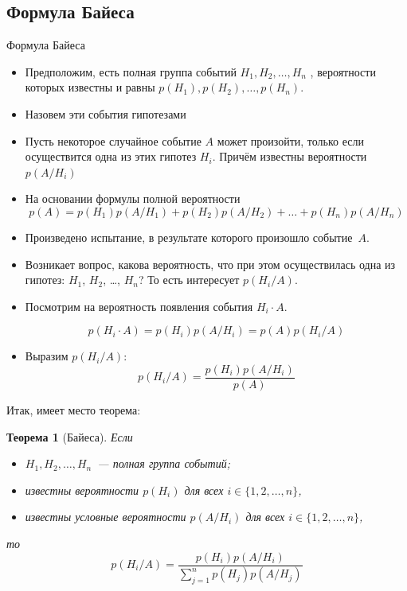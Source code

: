 \documentclass[unicode,11pt,notheorems,xcolor=table]{beamer}
\newtheorem{theorem}{Теорема}
\begin{document}
\subsection{Формула Байеса}
\begin{frame}[allowframebreaks]{Формула Байеса}
    \begin{itemize}
        \item Предположим, есть полная группа событий $H_1,H_2, \ldots, H_n$ , вероятности которых известны и равны $p(H_1), p(H_2),\ldots, p(H_n)$.
        \item Назовем эти события \alert{гипотезами}
        \item Пусть некоторое случайное событие $A$ может произойти, только если осуществится одна из этих гипотез $H_i$. Причём известны вероятности $p(A/H_i)$
        \item На основании формулы полной вероятности 
        $$
            p(A) = p(H_1)p(A/H_1)+ p(H_2)p(A/H_2)+\ldots+ p(H_n)p(A/H_n)
        $$
        \framebreak
        \item Произведено испытание, в результате которого произошло событие~$A$. 
        \item 
        Возникает вопрос, какова вероятность, что при этом осуществилась одна из гипотез: $H_1$, $H_2$, \ldots, $H_n$? То есть интересует $p(H_i/A)$.

        \item Посмотрим на вероятность появления события $H_i\cdot A$.
        
        $$
            p(H_i\cdot A) = p(H_i)p(A/H_i)= p(A)p(H_i/A)
        $$
        
        \item Выразим $p(H_i/A)$:
        $$
            p(H_i/A) = \frac{p(H_i)p(A/H_i)}{p(A)}
        $$
    \end{itemize}

    Итак, имеет место теорема:

    \begin{theorem}[Байеса]
        Если 
        \begin{itemize}
            \item $H_1,H_2,\ldots, H_n$~--- полная группа событий;
            \item  известны вероятности $p(H_i)$ для всех $i\in \{1,2,\ldots,n\}$,
            \item известны условные вероятности $p(A/H_i)$ для всех $i\in \{1,2,\ldots,n\}$,
        \end{itemize}
        то
        $$
            p(H_i/A) = \frac{p(H_i)p(A/H_i)}{\sum_{j=1}^n p(H_j)p(A/H_j)}
        $$
    \end{theorem}
 \end{frame}
\end{document}
